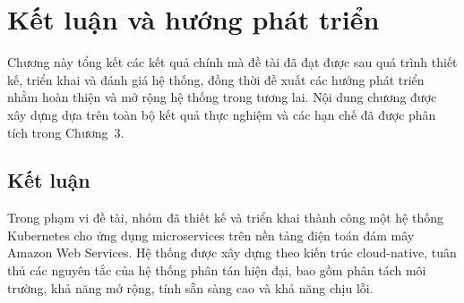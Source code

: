 






\chapter{Kết luận và hướng phát triển}
\label{chap:chap4-conclusion-future}

Chương này tổng kết các kết quả chính mà đề tài đã đạt được sau quá trình thiết kế,
triển khai và đánh giá hệ thống, đồng thời đề xuất các hướng phát triển nhằm hoàn
thiện và mở rộng hệ thống trong tương lai. Nội dung chương được xây dựng dựa trên
toàn bộ kết quả thực nghiệm và các hạn chế đã được phân tích trong Chương~3.

\section{Kết luận}
\label{sec:chap4-conclusion}

Trong phạm vi đề tài, nhóm đã thiết kế và triển khai thành công một hệ thống
Kubernetes cho ứng dụng microservices trên nền tảng điện toán đám mây Amazon Web
Services. Hệ thống được xây dựng theo kiến trúc cloud-native, tuân thủ các nguyên
tắc của hệ thống phân tán hiện đại, bao gồm phân tách môi trường, khả năng mở rộng,
tính sẵn sàng cao và khả năng chịu lỗi.

